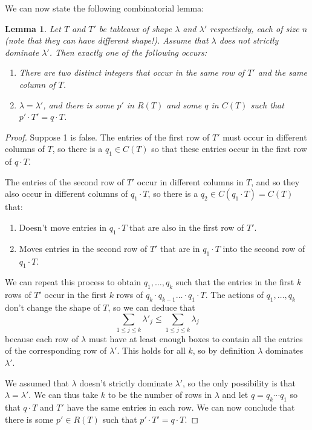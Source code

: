 \documentclass[12pt,twoside]{reedthesis}
\theoremstyle{plain}   %
\newtheorem{lemma}{Lemma}[section]
\theoremstyle{definition}
\theoremstyle{remark}
\numberwithin{equation}{section}
\begin{document}
  We can now state the following  combinatorial lemma:
  \begin{lemma} \label{lem1}
    Let $T$ and $T'$ be tableaux of shape $\lambda$ and $\lambda'$ respectively, each of size $n$ (note that they can have different shape!).
    Assume that $\lambda$ does not strictly dominate $\lambda'$.
    Then exactly one of the following occurs:
    \begin{enumerate}
    \item There are two distinct integers that occur in the same row of $T'$ and the same column of $T$.
    \item $\lambda = \lambda'$, and there is some $p'$ in $R(T)$ and some $q$ in $C(T)$ such that $p' \cdot T' = q \cdot T$.
    \end{enumerate}
  \end{lemma}
  \begin{proof}
    Suppose 1 is false. The entries of the first row of $T'$ must occur in different columns of $T$,
    so there is a $q_1 \in C(T)$ so that these entries occur in the first row of $q \cdot T$.\par
    The entries of the second row of $T'$ occur in different columns in $T$, and so they also occur in different columns of $q_1 \cdot T$,
    so there is a $q_2 \in C(q_1 \cdot T) = C(T)$ that:
    \begin{enumerate}
    \item Doesn't move entries in $q_1 \cdot T$ that are also in the first row of $T'$.
    \item Moves entries in the second row of $T'$ that are in $q_1 \cdot T$
      into the second row of $q_1 \cdot T$.
    \end{enumerate}
    We can repeat this process to obtain $q_1, \dots, q_k$ such that the entries in the first $k$ rows of $T'$ occur in the first $k$ rows of
    $q_k \cdot q_{k-1} \dots \cdot q_1 \cdot T$. The actions of $q_1, \dots, q_k$ don't change the shape of $T$, so we can deduce that
    \[\sum_{1 \leq j \leq k} \lambda'_j \leq \sum_{1 \leq j \leq k} \lambda_j\]
    because each row of $\lambda$ must have at least enough boxes to contain all the entries of the corresponding row of $\lambda'$.
    This holds for all $k$, so by definition $\lambda$ dominates $\lambda'$. \par
    We assumed that $\lambda$ doesn't strictly dominate $\lambda'$, so the only possibility is that $\lambda = \lambda'$.
    We can thus take $k$ to be the number of rows in $\lambda$ and let $q = q_k \cdots q_1$ so that
    $q \cdot T$ and $T'$ have the same entries in each row.
    We can now conclude that there is some $p' \in R(T)$ such that $p' \cdot T' = q \cdot T$.
  \end{proof}
\end{document}
